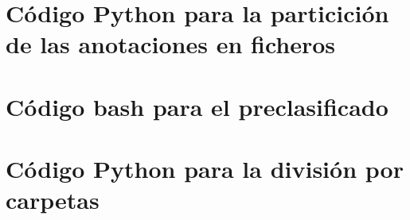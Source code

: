\documentclass[12pt]{report} %
\begin{document}
    \section*{Código Python para la particición de las anotaciones en ficheros}
    

    \section*{Código bash para el preclasificado}
    \label{preclasificado}
    

    \section*{Código Python para la división por carpetas}
    \label{div_carpetas}
    
\end{document}
